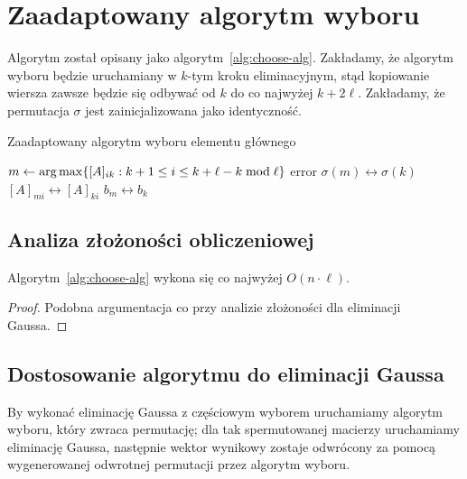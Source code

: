 \documentclass[../main.tex]{subfiles}
\begin{document}
  \section{Zaadaptowany algorytm wyboru}
  Algorytm został opisany jako algorytm~\ref{alg:choose-alg}.
  Zakładamy, że algorytm wyboru będzie uruchamiany w \( k \)-tym kroku
  eliminacyjnym, stąd kopiowanie wiersza zawsze będzie się odbywać
  od \( k \) do co najwyżej \( k + 2 \ell \). Zakładamy, że permutacja
  \( \sigma \) jest zainicjalizowana jako identyczność.
  \begin{algorithm}
    \caption{Zaadaptowany algorytm wyboru elementu głównego}
    \label{alg:choose-alg}
    \begin{algorithmic}[1]
          \State $m \gets \operatorname*{arg\,max} \{ [A]_{ik} : k + 1 \le i \le k + \ell - k \bmod \ell \}$ 
            \State \Return error
          \Else
            \State $\sigma(m) \leftrightarrow \sigma(k)$
             
              \State $[A]_{mi} \leftrightarrow [A]_{ki}$
            \EndFor
            \State $b_m \leftrightarrow b_k$ 
          \EndIf
      \EndProcedure
    \end{algorithmic}
  \end{algorithm}

  \subsection{Analiza złożoności obliczeniowej}
  
  \begin{fact}
    Algorytm~\ref{alg:choose-alg} wykona się co najwyżej \( O(n \cdot \ell) \).
  \end{fact}
  \begin{proof}
    Podobna argumentacja co przy analizie złożoności dla eliminacji Gaussa.
  \end{proof}

  \subsection{Dostosowanie algorytmu do eliminacji Gaussa}
  By wykonać eliminację Gaussa z częściowym wyborem uruchamiamy
  algorytm wyboru, który zwraca permutację; dla tak spermutowanej
  macierzy uruchamiamy eliminację Gaussa, następnie wektor wynikowy
  zostaje odwrócony za pomocą wygenerowanej odwrotnej permutacji
  przez algorytm wyboru.
\end{document}
